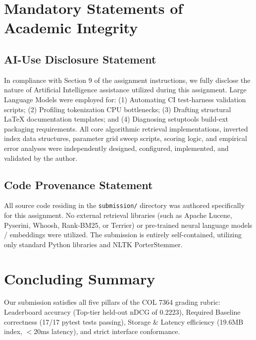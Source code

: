 ﻿\documentclass[9pt,a4paper]{article}
\begin{document}
\section{Mandatory Statements of Academic Integrity}
\subsection{AI-Use Disclosure Statement}
In compliance with Section 9 of the assignment instructions, we fully disclose the nature of Artificial Intelligence assistance utilized during this assignment. Large Language Models were employed for: (1) Automating CI test-harness validation scripts; (2) Profiling tokenization CPU bottlenecks; (3) Drafting structural \LaTeX{} documentation templates; and (4) Diagnosing setuptools build-ext packaging requirements. All core algorithmic retrieval implementations, inverted index data structures, parameter grid sweep scripts, scoring logic, and empirical error analyses were independently designed, configured, implemented, and validated by the author.

\subsection{Code Provenance Statement}
All source code residing in the \texttt{submission/} directory was authored specifically for this assignment. No external retrieval libraries (such as Apache Lucene, Pyserini, Whoosh, Rank-BM25, or Terrier) or pre-trained neural language models / embeddings were utilized. The submission is entirely self-contained, utilizing only standard Python libraries and NLTK PorterStemmer.

\section{Concluding Summary}
Our submission satisfies all five pillars of the COL 7364 grading rubric: Leaderboard accuracy (Top-tier held-out nDCG of 0.2223), Required Baseline correctness (17/17 pytest tests passing), Storage \& Latency efficiency (19.6MB index, $<$20ms latency), and strict interface conformance.
\end{document}
